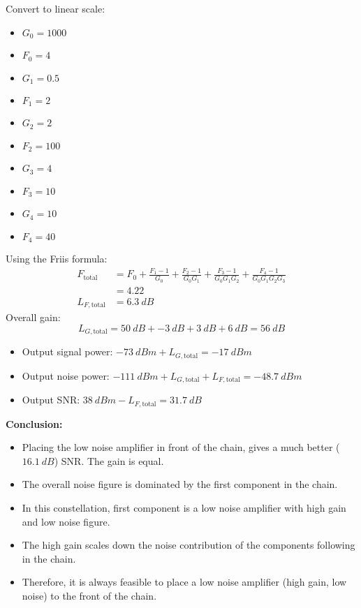 \begin{solution}
\begin{tasks}
		\task
		Convert to linear scale:
		\begin{itemize}
			\item $G_0 = 1000$
			\item $F_0 = 4$
			\item $G_1 = 0.5$
			\item $F_1 = 2$
			\item $G_2 = 2$
			\item $F_2 = 100$
			\item $G_3 = 4$
			\item $F_3 = 10$
			\item $G_4 = 10$
			\item $F_4 = 40$
		\end{itemize}
	
		Using the Friis formula:
		\begin{equation*}
			\begin{split}
				F_{\text{total}} &= F_0 + \frac{F_1 - 1}{G_0} + \frac{F_2 - 1}{G_0 G_1} + \frac{F_3 - 1}{G_0 G_1 G_2} + \frac{F_4 - 1}{G_0 G_1 G_2 G_3} \\
				 &= 4.22 \\
				L_{F,\text{total}} &= \SI{6.3}{dB}
			\end{split}
		\end{equation*}
		Overall gain:
		\begin{equation*}
			L_{G,\text{total}} = \SI{50}{dB} + \SI{-3}{dB} + \SI{3}{dB} + \SI{6}{dB} = \SI{56}{dB}
		\end{equation*}
		\begin{itemize}
			\item Output signal power: $\SI{-73}{dBm} + L_{G,\text{total}} = \SI{-17}{dBm}$
			\item Output noise power: $\SI{-111}{dBm} + L_{G,\text{total}} + L_{F,\text{total}} = \SI{-48.7}{dBm}$
			\item Output SNR: $\SI{38}{dBm} - L_{F,\text{total}} = \SI{31.7}{dB}$
		\end{itemize}
	
		\textbf{Conclusion:}
		\begin{itemize}
			\item Placing the low noise amplifier in front of the chain, gives a much better ($\SI{16.1}{dB}$) SNR. The gain is equal.
			\item The overall noise figure is dominated by the first component in the chain.
			\item In this constellation, first component is a low noise amplifier with high gain and low noise figure.
			\item The high gain scales down the noise contribution of the components following in the chain.
			\item Therefore, it is always feasible to place a low noise amplifier (high gain, low noise) to the front of the chain.
		\end{itemize}
	\end{tasks}
\end{solution}

